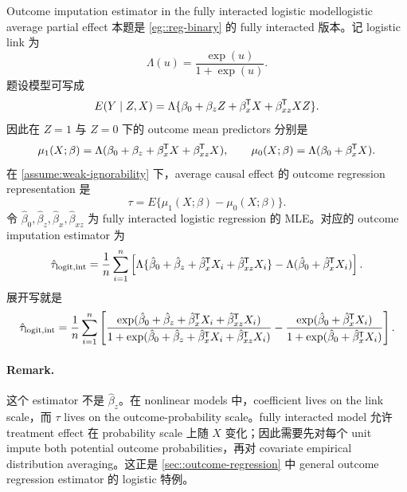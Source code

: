 \begin{exercisesolution}{Outcome imputation estimator in the fully interacted logistic model}{logistic average partial effect}
本题是 \cref{eg::reg-binary} 的 fully interacted 版本。记 logistic link 为
\[
\Lambda(u)=\frac{\exp(u)}{1+\exp(u)}.
\]
题设模型可写成
\[
E(Y\mid Z,X)
=\Lambda\{\beta_0+\beta_z Z+\beta_x^{\mkern-1.5mu\mathsf{T}} X+\beta_{xz}^{\mkern-1.5mu\mathsf{T}} XZ\}.
\]
因此在 $Z=1$ 与 $Z=0$ 下的 outcome mean predictors 分别是
\[
\mu_1(X;\beta)
=\Lambda(\beta_0+\beta_z+\beta_x^{\mkern-1.5mu\mathsf{T}} X+\beta_{xz}^{\mkern-1.5mu\mathsf{T}} X),
\qquad
\mu_0(X;\beta)
=\Lambda(\beta_0+\beta_x^{\mkern-1.5mu\mathsf{T}} X).
\]
在 \cref{assume:weak-ignorability} 下，average causal effect 的 outcome regression representation 是
\[
\tau
=E\{\mu_1(X;\beta)-\mu_0(X;\beta)\}.
\]
令 $\hat\beta_0,\hat\beta_z,\hat\beta_x,\hat\beta_{xz}$ 为 fully interacted logistic regression 的 MLE。对应的 outcome imputation estimator 为
\[
\hat\tau_{\mathrm{logit,int}}
=\frac{1}{n}\sum_{i=1}^n
\left[
\Lambda\{\hat\beta_0+\hat\beta_z+\hat\beta_x^{\mkern-1.5mu\mathsf{T}} X_i+\hat\beta_{xz}^{\mkern-1.5mu\mathsf{T}} X_i\}
-\Lambda(\hat\beta_0+\hat\beta_x^{\mkern-1.5mu\mathsf{T}} X_i)
\right].
\]
展开写就是
\[
\hat\tau_{\mathrm{logit,int}}
=\frac{1}{n}\sum_{i=1}^n
\left[
\frac{\exp(\hat\beta_0+\hat\beta_z+\hat\beta_x^{\mkern-1.5mu\mathsf{T}} X_i+\hat\beta_{xz}^{\mkern-1.5mu\mathsf{T}} X_i)}
{1+\exp(\hat\beta_0+\hat\beta_z+\hat\beta_x^{\mkern-1.5mu\mathsf{T}} X_i+\hat\beta_{xz}^{\mkern-1.5mu\mathsf{T}} X_i)}
-
\frac{\exp(\hat\beta_0+\hat\beta_x^{\mkern-1.5mu\mathsf{T}} X_i)}
{1+\exp(\hat\beta_0+\hat\beta_x^{\mkern-1.5mu\mathsf{T}} X_i)}
\right].
\]

\paragraph{Remark.}
这个 estimator 不是 $\hat\beta_z$。在 nonlinear models 中，coefficient lives on the link scale，而 $\tau$ lives on the outcome-probability scale。fully interacted model 允许 treatment effect 在 probability scale 上随 $X$ 变化；因此需要先对每个 unit impute both potential outcome probabilities，再对 covariate empirical distribution averaging。这正是 \cref{sec::outcome-regression} 中 general outcome regression estimator 的 logistic 特例。
\end{exercisesolution}

